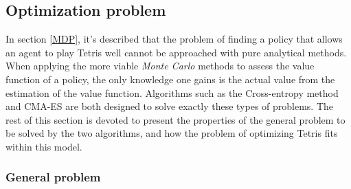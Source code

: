 \subsection{Optimization problem}

In section \ref{MDP}, it's described that the problem of
finding a policy that allows an agent to play Tetris well
cannot be approached with pure analytical methods.
When applying the more viable \textit{Monte Carlo} methods
to assess the value function of a policy, the only 
knowledge one gains is the actual value from the estimation 
of the value function. Algorithms such as the Cross-entropy method
and CMA-ES are both designed to solve exactly these types of problems.
The rest of this section is devoted to present the properties of the 
general problem to be solved by the two algorithms, and how the 
problem of optimizing Tetris fits within this model.

\subsubsection{General problem \label{ProblemFormulation}}

